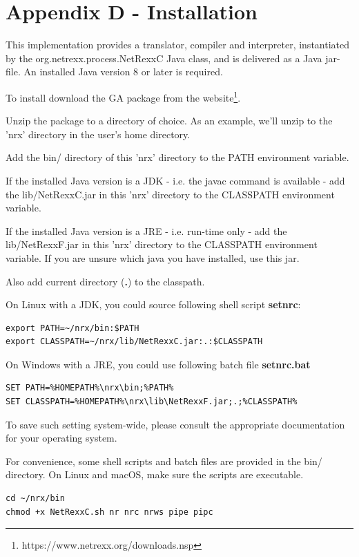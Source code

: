 \chapter{Appendix D - Installation}\label{installation}

This \nr{} implementation provides a translator, compiler and interpreter, instantiated by the 
org.netrexx.process.NetRexxC Java class, and is delivered as a Java jar-file. An installed Java version 8 or later is required.

To install \nr{} download the GA package from the \nr{} website\footnote{https://www.netrexx.org/downloads.nsp}.

Unzip the package to a directory of choice. As an example, we'll unzip to the 'nrx' directory in the user's home directory.

Add the bin/ directory of this 'nrx' directory to the PATH environment variable.

If the installed Java version is a JDK - i.e. the javac command is available - add the lib/NetRexxC.jar in this 'nrx' directory to the CLASSPATH environment variable.

If the installed Java version is a JRE - i.e. run-time only - add the lib/NetRexxF.jar in this 'nrx' directory to the CLASSPATH environment variable. If you are unsure which java you have installed, use this jar.

Also add current directory (\textbf{.}) to the classpath.

On Linux with a JDK, you could source following shell script \textbf{setnrc}:

\begin{lstlisting}
export PATH=~/nrx/bin:$PATH
export CLASSPATH=~/nrx/lib/NetRexxC.jar:.:$CLASSPATH
\end{lstlisting}

On Windows with a JRE, you could use following batch file \textbf{setnrc.bat}

\begin{lstlisting}
SET PATH=%HOMEPATH%\nrx\bin;%PATH%
SET CLASSPATH=%HOMEPATH%\nrx\lib\NetRexxF.jar;.;%CLASSPATH%
\end{lstlisting}

To save such setting system-wide, please consult the appropriate documentation for your operating system.


For convenience, some shell scripts and batch files are provided in the bin/ directory. On Linux and macOS, 
make sure the scripts are executable.

\begin{lstlisting}
cd ~/nrx/bin
chmod +x NetRexxC.sh nr nrc nrws pipe pipc
\end{lstlisting}


